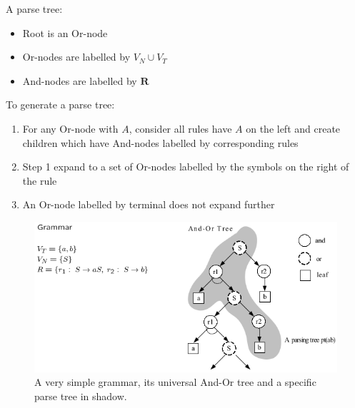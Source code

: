 \documentclass[10pt,oneside]{book}
\begin{document}
A parse tree:
%
\begin{itemize}
  \item Root is an Or-node
  \item Or-nodes are labelled by $V_N \cup V_T$
  \item And-nodes are labelled by $\mathbf{R}$
\end{itemize}
%
To generate a parse tree:
%
\begin{enumerate}
  \item For any Or-node with $A$, consider all rules have $A$ on the left and
    create children which have And-nodes labelled by corresponding rules
  \item Step 1 expand to a set of Or-nodes labelled by the symbols on the right
    of the rule
  \item An Or-node labelled by terminal does not expand further
\end{enumerate}
%
\begin{figure}[!htpb]
  \centering
  \includegraphics[width=0.7\linewidth]{./fig/fig_1_2.png}
  \caption{A very simple grammar, its universal And-Or tree and a specific
    parse tree in shadow.}%
  \label{fig:1.2}
\end{figure}
%
\end{document}
